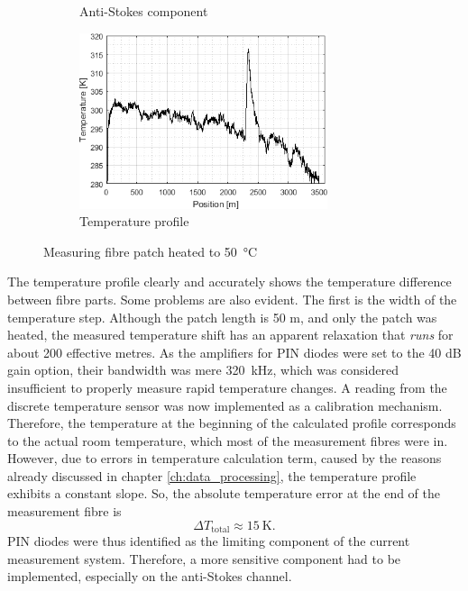\documentclass{standalone}
\begin{document}
\begin{figure}[h!]
\begin{subfigure}[b]{0.49\textwidth}
		\caption{Anti-Stokes component}
		\vspace{1em}
	\end{subfigure}
	\begin{subfigure}[b]{\textwidth}
		\centering
		\includegraphics[width=0.8\textwidth]{first_50c_temp.png}
		\caption{Temperature profile}
	\end{subfigure}
	\caption{Measuring fibre patch heated to \SI{50}{\celsius}}
	\label{fig:first_50c}
\end{figure}
The temperature profile clearly and accurately shows the temperature difference between fibre parts. Some problems are also evident. The first is the width of the temperature step. Although the patch length is 50 m, and only the patch was heated, the measured temperature shift has an apparent relaxation that \textit{runs} for about 200 effective metres. As the amplifiers for PIN diodes were set to the 40 dB gain option, their bandwidth was mere \SI{320}{\kilo \hertz}, which was considered insufficient to properly measure rapid temperature changes. A reading from the discrete temperature sensor was now implemented as a calibration mechanism. Therefore, the temperature at the beginning of the calculated profile corresponds to the actual room temperature, which most of the measurement fibres were in. However, due to errors in temperature calculation term, caused by the reasons already discussed in chapter \ref{ch:data_processing}, the temperature profile exhibits a constant slope. So, the absolute temperature error at the end of the measurement fibre is 
\begin{equation}
\varDelta T_\textrm{total} \approx \SI{15}{\kelvin} \textrm{.}
\end{equation}
PIN diodes were thus identified as the limiting component of the current measurement system. Therefore, a more sensitive component had to be implemented, especially on the anti-Stokes channel. \\
\end{document}
